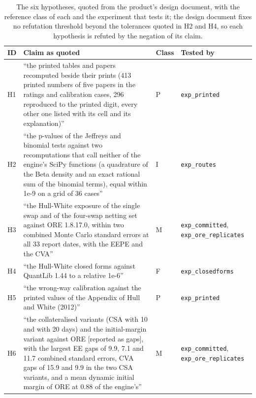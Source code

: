 \begin{table}[htbp]
\centering
\small
\caption{The six hypotheses, quoted from the product's design document, with the reference class of each and the experiment that tests it; the design document fixes no refutation threshold beyond the tolerances quoted in H2 and H4, so each hypothesis is refuted by the negation of its claim.}
\label{tab:hypotheses}
\begin{tabularx}{\textwidth}{@{}l>{\raggedright\arraybackslash}X l l@{}}
\toprule
ID & Claim as quoted & Class & Tested by \\
\midrule
H1 & ``the printed tables and papers recomputed beside their prints (413 printed numbers of five papers in the ratings and calibration cases, 296 reproduced to the printed digit, every other one listed with its cell and its explanation)'' & P & \texttt{exp\_printed} \\
H2 & ``the p-values of the Jeffreys and binomial tests against two recomputations that call neither of the engine's SciPy functions (a quadrature of the Beta density and an exact rational sum of the binomial terms), equal within 1e-9 on a grid of 36 cases'' & I & \texttt{exp\_routes} \\
H3 & ``the Hull-White exposure of the single swap and of the four-swap netting set against ORE 1.8.17.0, within two combined Monte Carlo standard errors at all 33 report dates, with the EEPE and the CVA'' & M & \texttt{exp\_committed}, \texttt{exp\_ore\_replicates} \\
H4 & ``the Hull-White closed forms against QuantLib 1.44 to a relative 1e-6'' & F & \texttt{exp\_closedforms} \\
H5 & ``the wrong-way calibration against the printed values of the Appendix of Hull and White (2012)'' & P & \texttt{exp\_printed} \\
H6 & ``the collateralised variants (CSA with 10 and with 20 days) and the initial-margin variant against ORE [reported as gaps], with the largest EE gaps of 9.9, 7.1 and 11.7 combined standard errors, CVA gaps of 15.9 and 9.9 in the two CSA variants, and a mean dynamic initial margin of ORE at 0.88 of the engine's'' & M & \texttt{exp\_committed}, \texttt{exp\_ore\_replicates} \\
\bottomrule
\end{tabularx}
\end{table}

